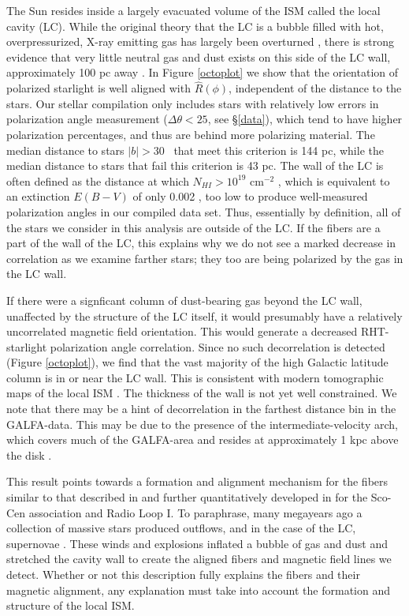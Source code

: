 The Sun resides inside a largely evacuated volume of the ISM called the local cavity (LC). While the original theory that the LC is a bubble filled with hot, overpressurized, X-ray emitting gas has largely been overturned \citep{Koutroumpa09,WS10,2011ApJ...735..129P}, there is strong evidence that very little neutral gas and dust exists on this side of the LC wall, approximately 100 pc away \citep[see][for a detailed map]{2013arXiv1309.6100L}. In Figure \ref{octoplot} we show that the orientation of polarized starlight is well aligned with $\hat{R}\left(\phi\right)$, independent of the distance to the stars. Our stellar compilation only includes stars with relatively low errors in polarization angle measurement ($\Delta \theta < 25$\degree, see \S \ref{data}), which tend to have higher polarization percentages, and thus are behind more polarizing material. The median distance to stars $|b| > 30$\degree~ that meet this criterion is 144 pc, while the median distance to stars that fail this criterion is 43 pc. The wall of the LC is often defined as the distance at which $N_{HI} > 10^{19}$ cm$^{-2}$ \citep{CR87}, which is equivalent to an extinction $E\left(B-V\right)$ of only 0.002 \citep{2013ApJ...766L...6P}, too low to produce well-measured polarization angles in our compiled data set. Thus, essentially by definition, all of the stars we consider in this analysis are outside of the LC. If the fibers are a part of the wall of the LC, this explains why we do not see a marked decrease in correlation as we examine farther stars; they too are being polarized by the gas in the LC wall.

If there were a signficant column of dust-bearing gas beyond the LC wall, unaffected by the structure of the LC itself, it would presumably have a relatively uncorrelated magnetic field orientation. This would generate a decreased RHT-starlight polarization angle correlation. Since no such decorrelation is detected (Figure \ref{octoplot}), we find that the vast majority of the high Galactic latitude column is in or near the LC wall. This is consistent with modern tomographic maps of the local ISM \citep{Vergely10, 2013arXiv1309.6100L}. The thickness of the wall is not yet well constrained. We note that there may be a hint of decorrelation in the farthest distance bin in the GALFA-\hi data. This may be due to the presence of the intermediate-velocity arch, which covers much of the GALFA-\hi area and resides at approximately 1 kpc above the disk \citep{Kuntz:1996ff}.

This result points towards a formation and alignment mechanism for the fibers similar to that described in \citet{Weaver:1979vh} and further quantitatively developed in \citet{1998LNP...506..227H} for the Sco-Cen association and Radio Loop I. To paraphrase, many megayears ago a collection of massive stars produced outflows, and in the case of the LC, supernovae \citep{CR87}. These winds and explosions inflated a bubble of gas and dust and stretched the cavity wall to create the aligned fibers and magnetic field lines we detect. Whether or not this description fully explains the fibers and their magnetic alignment, any explanation must take into account the formation and structure of the local ISM.

